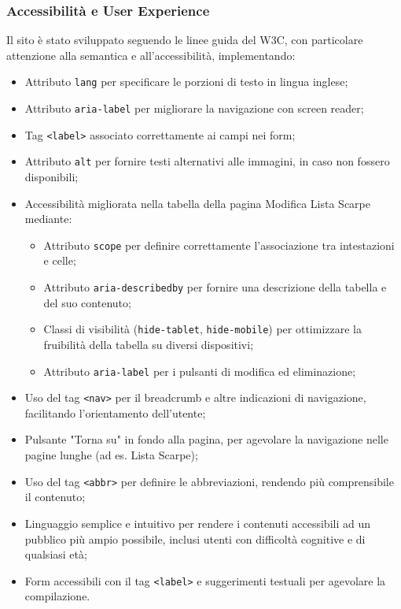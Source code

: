 \documentclass[a4paper, 12pt]{article}
\begin{document}
\begin{justify}
\subsubsection{Accessibilità e User Experience}

Il sito è stato sviluppato seguendo le linee guida del W3C, con particolare attenzione alla semantica e all'accessibilità, implementando:
\begin{itemize}
    \item Attributo \texttt{lang} per specificare le porzioni di testo in lingua inglese;
    \item Attributo \texttt{aria-label} per migliorare la navigazione con screen reader;
    \item Tag \texttt{<label>} associato correttamente ai campi nei form;
    \item Attributo \texttt{alt} per fornire testi alternativi alle immagini, in caso non fossero disponibili;
    \item Accessibilità migliorata nella tabella della pagina Modifica Lista Scarpe mediante:
        \begin{itemize}
            \item Attributo \texttt{scope} per definire correttamente l'associazione tra intestazioni e celle;
            \item Attributo \texttt{aria-describedby} per fornire una descrizione della tabella e del suo contenuto;
            \item Classi di visibilità (\texttt{hide-tablet}, \texttt{hide-mobile}) per ottimizzare la fruibilità della tabella su diversi dispositivi;
            \item Attributo \texttt{aria-label} per i pulsanti di modifica ed eliminazione;
        \end{itemize}
    \item Uso del tag \texttt{<nav>} per il breadcrumb e altre indicazioni di navigazione, facilitando l'orientamento dell'utente;
    \item Pulsante "Torna su" in fondo alla pagina, per agevolare la navigazione nelle pagine lunghe (ad es. Lista Scarpe);
    \item Uso del tag \texttt{<abbr>} per definire le abbreviazioni, rendendo più comprensibile il contenuto;
    \item Linguaggio semplice e intuitivo per rendere i contenuti accessibili ad un pubblico più ampio possibile, inclusi utenti con difficoltà cognitive e di qualsiasi età;
    \item Form accessibili con il tag \texttt{<label>} e suggerimenti testuali per agevolare la compilazione.
\end{itemize}


\end{justify}
\end{document}

